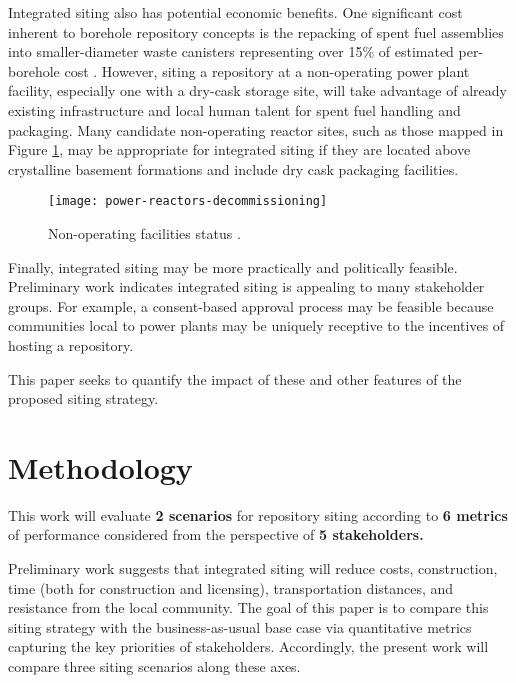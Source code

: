 Integrated siting also has potential economic benefits. One significant cost 
inherent to borehole repository concepts is the repacking of spent fuel 
assemblies into smaller-diameter waste canisters representing over 15\% of 
estimated per-borehole cost \cite{arnold_reference_2011}.  However, siting a 
repository at a non-operating power plant facility, especially one with a 
dry-cask storage site, will take advantage of already existing infrastructure 
and local human talent for spent fuel handling and packaging. Many candidate 
non-operating reactor sites, such as those mapped in Figure \ref{fig:shutdown}, 
may be appropriate for integrated siting if they are located above crystalline 
basement formations and include dry cask packaging facilities.

\begin{figure}[htpb!] 
  \centering
  \texttt{[image: power-reactors-decommissioning]}	
  \caption{Non-operating facilities status
  \cite{nuclear_regulatory_commission_nrc_2015}.}
  \label{fig:shutdown}
\end{figure}

Finally, integrated siting may be more practically and politically feasible. 
Preliminary work \cite{waleed_regional_2015} indicates integrated siting is 
appealing to many stakeholder groups. For example, a consent-based approval 
process may be feasible because communities local to power plants may be 
uniquely receptive to the incentives of hosting a repository. 

This paper seeks to quantify the impact of these and other features of the 
proposed siting strategy. 


\section{Methodology}

This work will evaluate \textbf{2 scenarios} for repository siting according to \textbf{6 metrics} of 
performance considered from the perspective of \textbf{5 stakeholders.}

Preliminary work \cite{waleed_regional_2015} suggests that integrated siting 
will reduce costs, construction, time (both for construction and licensing), 
transportation distances, and resistance from the local community.  
The goal of this paper is to compare this siting strategy with the 
business-as-usual base case via quantitative metrics capturing the key 
priorities of stakeholders. Accordingly, the present 
work will compare three siting scenarios along these axes. 

